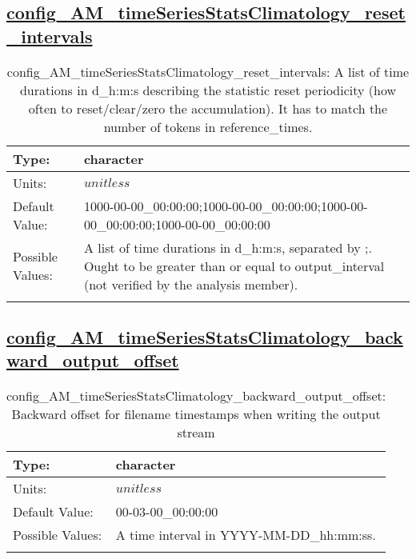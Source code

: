 \subsection[config\_AM\_timeSeriesStatsClimatology\_reset\_intervals]{\hyperref[sec:nm_tab_AM_timeSeriesStatsClimatology]{config\_AM\_timeSeriesStatsClimatology\_reset\_intervals}}
\label{subsec:nm_sec_config_AM_timeSeriesStatsClimatology_reset_intervals}
\begin{center}
\begin{longtable}{| p{2.0in} || p{4.0in} |}
    \hline
    Type: & character \\
    \hline
    Units: & $unitless$ \\
    \hline
    Default Value: & 1000-00-00\_00:00:00;1000-00-00\_00:00:00;1000-00-00\_00:00:00;1000-00-00\_00:00:00 \\
    \hline
    Possible Values: & A list of time durations in d\_h:m:s, separated by ;. Ought to be greater than or equal to output\_interval (not verified by the analysis member). \\
    \hline
    \caption{config\_AM\_timeSeriesStatsClimatology\_reset\_intervals: A list of time durations in d\_h:m:s describing the statistic reset periodicity (how often to reset/clear/zero the accumulation). It has to match the number of tokens in reference\_times.}
\end{longtable}
\end{center}
\subsection[config\_AM\_timeSeriesStatsClimatology\_backward\_output\_offset]{\hyperref[sec:nm_tab_AM_timeSeriesStatsClimatology]{config\_AM\_timeSeriesStatsClimatology\_backward\_output\_offset}}
\label{subsec:nm_sec_config_AM_timeSeriesStatsClimatology_backward_output_offset}
\begin{center}
\begin{longtable}{| p{2.0in} || p{4.0in} |}
    \hline
    Type: & character \\
    \hline
    Units: & $unitless$ \\
    \hline
    Default Value: & 00-03-00\_00:00:00 \\
    \hline
    Possible Values: & A time interval in YYYY-MM-DD\_hh:mm:ss. \\
    \hline
    \caption{config\_AM\_timeSeriesStatsClimatology\_backward\_output\_offset: Backward offset for filename timestamps when writing the output stream}
\end{longtable}
\end{center}
